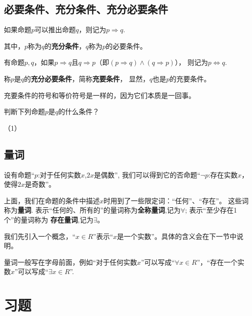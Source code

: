 \subsection{必要条件、充分条件、充分必要条件}
\begin{definition}
    如果命题$p$可以推出命题$q$，则记为$p \Rightarrow q $.

    其中，$p$称为$q$的\textbf{充分条件}，$q$称为$p$的必要条件。
\end{definition}

\begin{definition}
    有命题$p,q$，如果$p \Rightarrow q$且$q \Rightarrow p$（即$(p \Rightarrow q) \wedge (q \Rightarrow p)$），
    则记为$p \Leftrightarrow q$.

    称$p$是$q$的\textbf{充分必要条件}，简称\textbf{充要条件}，
    显然，$q$也是$p$的充要条件。
\end{definition}

充要条件的符号和等价符号是一样的，因为它们本质是一回事。

\begin{example}
    判断下列命题$p$是$q$的什么条件？

    （1）
\end{example}

\subsection{量词}
设有命题“$p$:对于任何实数$x$,$2x$是偶数”,
我们可以得到它的否命题“$\neg p$:存在实数$x$，使得$2x$是奇数”。

上面，我们在命题的条件中描述$x$时用到了一些限定词：“任何”、“存在”。
这些词称为\textbf{量词}.
表示“任何的、所有的”的量词称为\textbf{全称量词},记为$\forall$;
表示“至少存在1个”的量词称为 \textbf{存在量词},记为$\exists$。

我们先引入一个概念，“$x \in R$”表示“$x$是一个实数”。具体的含义会在下一节中说明。

量词一般写在字母前面，例如“对于任何实数$x$”可以写成“$\forall x \in R$”，“存在一个实数$x$”可以写成“$\exists x \in R$”.

\section*{习题 \thesection}
